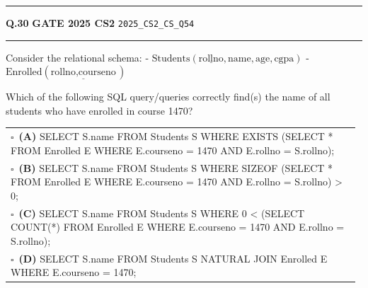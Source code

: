\documentclass[a4paper,10pt]{article}
\begin{document}
\vspace{6pt}\hrule height 0.35pt\vspace{6pt}
\noindent
\begin{tcolorbox}[
    blanker,
    sidebyside,
    sidebyside align=top,
    lefthand width=0.55\textwidth,
    top=4pt, bottom=4pt, left=0pt, right=0pt,
    middle=16pt,
    underlay={
        \draw[dashed, black!80, line width=0.8pt, dash pattern=on 4pt off 3pt]
            ([xshift=0.55\textwidth+8pt]frame.north west) --
            ([xshift=0.55\textwidth+8pt]frame.south west);
    }
]
\textbf{Q.30}  \hfill {\footnotesize\textbf{GATE 2025 CS2} \quad \tiny\texttt{2025\_CS2\_CS\_Q54}}
\vspace{2pt}\hrule height 0.3pt\vspace{4pt}

Consider the relational schema:
- $\text{Students}(\underline{\text{rollno}}, \text{name}, \text{age}, \text{cgpa})$
- $\text{Enrolled}(\underline{\text{rollno}, \text{courseno}})$
\par\medskip
Which of the following SQL query/queries correctly find(s) the name of all students who have enrolled in course 1470?

\par\vspace{6pt}\noindent
\begin{tabular}{@{}p{0.98\linewidth}@{}}
$\square$\ \textbf{(A)} SELECT S.name \newline FROM Students S \newline WHERE EXISTS (SELECT * FROM Enrolled E WHERE E.courseno = 1470 AND E.rollno = S.rollno); \\
\addlinespace[3pt]
$\square$\ \textbf{(B)} SELECT S.name \newline FROM Students S \newline WHERE SIZEOF (SELECT * FROM Enrolled E WHERE E.courseno = 1470 AND E.rollno = S.rollno) > 0; \\
\addlinespace[3pt]
$\square$\ \textbf{(C)} SELECT S.name \newline FROM Students S \newline WHERE 0 < (SELECT COUNT(*) FROM Enrolled E WHERE E.courseno = 1470 AND E.rollno = S.rollno); \\
\addlinespace[3pt]
$\square$\ \textbf{(D)} SELECT S.name \newline FROM Students S NATURAL JOIN Enrolled E \newline WHERE E.courseno = 1470;
\end{tabular}


\end{tcolorbox}
\end{document}
